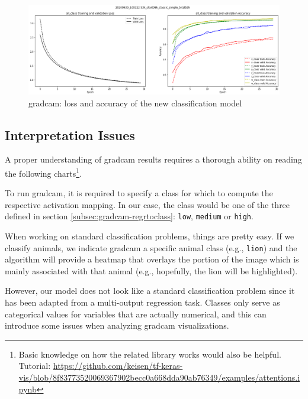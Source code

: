 \begin{figure}[!h]
	\centering
	\includegraphics[width=1\textwidth]{"contents/images/04-metrics-class-simple"}
	\caption[\gls{gradcam}: loss and accuracy of the new classification model]{\gls{gradcam}: loss and accuracy of the new classification model}
	\label{fig:gradcam-retrain-simple}
\end{figure}



\subsection{Interpretation Issues}
\label{subsec:gradcam-reading}

A proper understanding of \gls{gradcam} results requires a thorough ability on reading the following charts\footnote{Basic knowledge on how the related library works would also be helpful. Tutorial: \url{https://github.com/keisen/tf-keras-vis/blob/8f83773520069367902becc0a668dda90ab76349/examples/attentions.ipynb}}.
 
\medskip

To run \gls{gradcam}, it is required to specify a class for which to compute the respective activation mapping. In our case, the class would be one of the three defined in section \ref{subsec:gradcam-regrtoclass}: \texttt{low}, \texttt{medium} or \texttt{high}. 

When working on standard classification problems, things are pretty easy. If we classify animals, we indicate \gls{gradcam} a specific animal class (e.g., \texttt{lion}) and the algorithm will provide a heatmap that overlays the portion of the image which is mainly associated with that animal (e.g., hopefully, the lion will be highlighted).

However, our model does not look like a standard classification problem since it has been adapted from a multi-output regression task. Classes only serve as categorical values for variables that are actually numerical, and this can introduce some issues when analyzing \gls{gradcam} visualizations.

